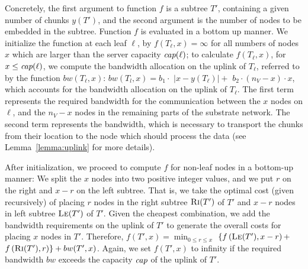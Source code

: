 \documentclass[preprint,12pt]{elsarticle}
\newcommand{\ChunkCount}{\ensuremath{y}}
\newcommand{\capacity}{\emph{cap}}
\newcommand{\Tree}{\ensuremath{T}}
\newcommand{\CostTrans}{\ensuremath{b_1}}
\newcommand{\CostCom}{\ensuremath{b_2}}
\newcommand{\Vms}{\ensuremath{n_V}}
\begin{document}
Concretely, the first argument to function $f$
is a subtree $\Tree'$, containing a given number of
chunks $\ChunkCount(\Tree')$,
and the
second argument is the number of nodes to be embedded in the subtree.
Function $f$ is evaluated in a bottom up manner. We initialize the
function at each leaf $\ell$, by $f(T_{\ell},x) =
\infty$ for all numbers of nodes $x$ which are larger than
the server capacity $\capacity(\ell)$;
to calculate $f(T_{\ell}, x)$, for $x \leq \capacity(\ell)$, we compute the
bandwidth allocation on the uplink of $T_{\ell}$, referred to by the function
$bw(T_{\ell},x)$:
$bw(T_l,x)=  \CostTrans \cdot $ $|x - \ChunkCount(T_{\ell})| +$ $ \CostCom \cdot
(\Vms - x) \cdot x$,
which accounts for the bandwidth allocation on the uplink of $T_{\ell}$. The
first
term represents the required bandwidth for the communication between the $x$
nodes on $\ell$, and the $\Vms - x$ nodes in the remaining parts of the substrate
network.
The second term represents
the bandwidth, which is necessary to transport the chunks from their location to
the node which should process the data (see Lemma~\ref{lemma:uplink} for more
details).

After initialization, we proceed to compute $f$ for non-leaf
nodes in a bottom-up manner: We split the $x$ nodes
into two positive integer
values, and we put $r$ on the right and $x - r$ on the left subtree.
That is, we take the optimal cost
(given recursively) of placing $r$ nodes in
the right subtree $\textsc{Ri}(T')$ of $T'$ and $x-r$ nodes in left subtree $\textsc{Le}(T')$ of
$T'$. Given the cheapest combination, we add the bandwidth requirements
on the uplink of $T'$ to generate the overall costs for placing $x$ nodes in $T'$.
Therefore, $f(T',x) =   \min_{0\leq r \leq x}$ $ \{  f\left(\textsc{Le}(T'),
x-r\right) +$ $
f\left(\textsc{Ri}(T'), r\right) \} + bw(T',x)$.
Again, we set $f(T',x)$ to infinity if the required bandwidth
$bw$ exceeds the capacity $\capacity$ of the uplink of $T'$.
\end{document}
